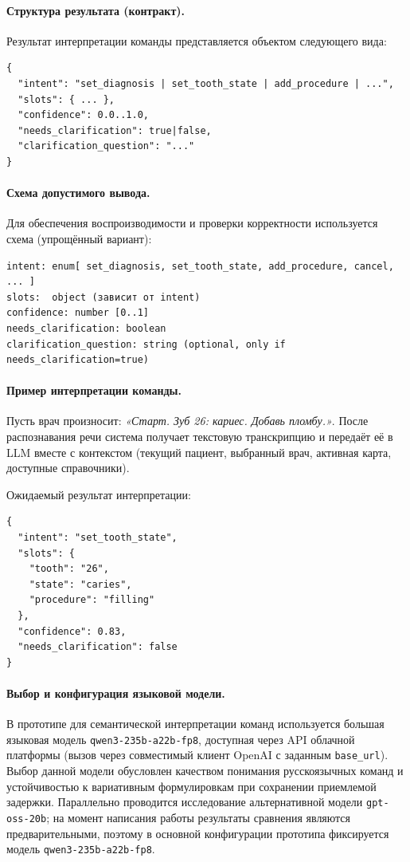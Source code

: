 \paragraph{Структура результата (контракт).}
Результат интерпретации команды представляется объектом следующего вида:
\begin{verbatim}
{
  "intent": "set_diagnosis | set_tooth_state | add_procedure | ...",
  "slots": { ... },
  "confidence": 0.0..1.0,
  "needs_clarification": true|false,
  "clarification_question": "..."
}
\end{verbatim}

\paragraph{Схема допустимого вывода.}
Для обеспечения воспроизводимости и проверки корректности используется схема (упрощённый вариант):
\begin{verbatim}
intent: enum[ set_diagnosis, set_tooth_state, add_procedure, cancel, ... ]
slots:  object (зависит от intent)
confidence: number [0..1]
needs_clarification: boolean
clarification_question: string (optional, only if needs_clarification=true)
\end{verbatim}

\paragraph{Пример интерпретации команды.}
Пусть врач произносит: \textit{«Старт. Зуб 26: кариес. Добавь пломбу.»}.
После распознавания речи система получает текстовую транскрипцию и передаёт её в LLM вместе с контекстом
(текущий пациент, выбранный врач, активная карта, доступные справочники).

Ожидаемый результат интерпретации:
\begin{verbatim}
{
  "intent": "set_tooth_state",
  "slots": {
    "tooth": "26",
    "state": "caries",
    "procedure": "filling"
  },
  "confidence": 0.83,
  "needs_clarification": false
}
\end{verbatim}


\paragraph{Выбор и конфигурация языковой модели.}
В прототипе для семантической интерпретации команд используется большая языковая модель \texttt{qwen3-235b-a22b-fp8}, доступная через API облачной платформы (вызов через совместимый клиент OpenAI с заданным \texttt{base\_url}).
Выбор данной модели обусловлен качеством понимания русскоязычных команд и устойчивостью к вариативным формулировкам при сохранении приемлемой задержки.
Параллельно проводится исследование альтернативной модели \texttt{gpt-oss-20b}; на момент написания работы результаты сравнения являются предварительными, поэтому в основной конфигурации прототипа фиксируется модель \texttt{qwen3-235b-a22b-fp8}.

